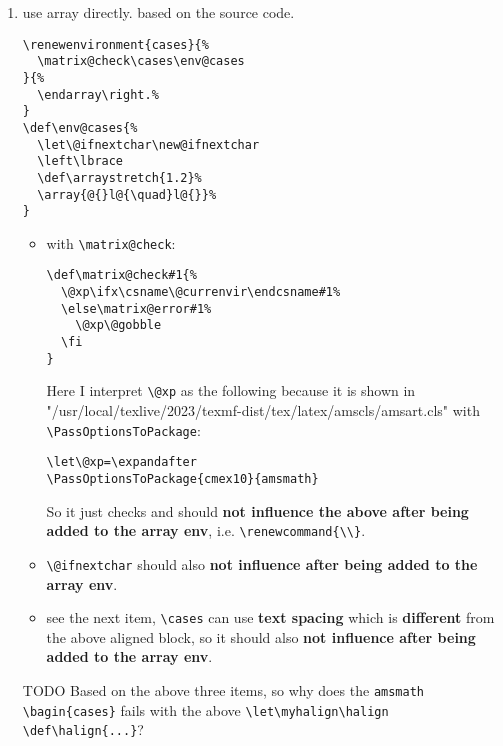 \documentclass{article}
\begin{document}
\begin{enumerate}
    \item use array directly. based on the source code.
          \begin{verbatim}
\renewenvironment{cases}{%
  \matrix@check\cases\env@cases
}{%
  \endarray\right.%
}
\def\env@cases{%
  \let\@ifnextchar\new@ifnextchar
  \left\lbrace
  \def\arraystretch{1.2}%
  \array{@{}l@{\quad}l@{}}%
}
\end{verbatim}

          \begin{itemize}
              \item with \verb|\matrix@check|:
                    \begin{verbatim}
\def\matrix@check#1{%
  \@xp\ifx\csname\@currenvir\endcsname#1%
  \else\matrix@error#1%
    \@xp\@gobble
  \fi
}
\end{verbatim}
                    Here I interpret \verb|\@xp| as the following because it is shown in "/usr/local/texlive/2023/texmf-dist/tex/latex/amscls/amsart.cls" with \verb|\PassOptionsToPackage|:
                    \begin{verbatim}
\let\@xp=\expandafter
\PassOptionsToPackage{cmex10}{amsmath}
\end{verbatim}
                    So it just checks and should  \textbf{not influence the above after being added to the array env}, i.e. \verb|\renewcommand{\\}|.
              \item \verb|\@ifnextchar| should also \textbf{not influence after being added to the array env}.
              \item see the next item, \verb|\cases| can use \textbf{text spacing} which is \textbf{different} from the above aligned block, so it should also \textbf{not influence after being added to the array env}.
          \end{itemize}
          TODO Based on the above three items, so why does the \verb|amsmath \bagin{cases}| fails with the above \verb|\let\myhalign\halign \def\halign{...}|?


\end{enumerate}
\end{document}
